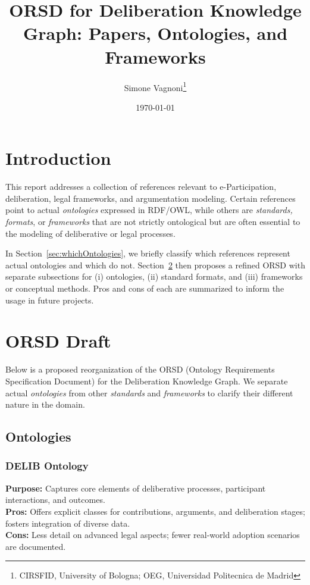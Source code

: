 \documentclass[11pt,a4paper]{article}
\title{\textbf{ORSD for Deliberation Knowledge Graph: Papers, Ontologies, and Frameworks}}
\author{Simone Vagnoni\thanks{CIRSFID, University of Bologna; OEG, Universidad Politecnica de Madrid}}
\date{\today}
\begin{document}
\maketitle


\tableofcontents

\section{Introduction}
This report addresses a collection of references relevant to e-Participation, deliberation, legal frameworks, and argumentation modeling. Certain references point to actual \emph{ontologies} expressed in RDF/OWL, while others are \emph{standards, formats}, or \emph{frameworks} that are not strictly ontological but are often essential to the modeling of deliberative or legal processes. 

In Section~\ref{sec:whichOntologies}, we briefly classify which references represent actual ontologies and which do not. Section~\ref{sec:orsdRefined} then proposes a refined ORSD with separate subsections for (i) ontologies, (ii) standard formats, and (iii) frameworks or conceptual methods. Pros and cons of each are summarized to inform the usage in future projects.


\section{ORSD Draft}\label{sec:orsdRefined}

Below is a proposed reorganization of the ORSD (Ontology Requirements Specification Document) for the Deliberation Knowledge Graph. We separate actual \emph{ontologies} from other \emph{standards} and \emph{frameworks} to clarify their different nature in the domain.

\subsection{Ontologies}

\subsubsection{DELIB Ontology \cite{PanagiotopoulosGionis2011}}
\textbf{Purpose:} Captures core elements of deliberative processes, participant interactions, and outcomes.\\
\textbf{Pros:} Offers explicit classes for contributions, arguments, and deliberation stages; fosters integration of diverse data.\\
\textbf{Cons:} Less detail on advanced legal aspects; fewer real-world adoption scenarios are documented.
\end{document}
